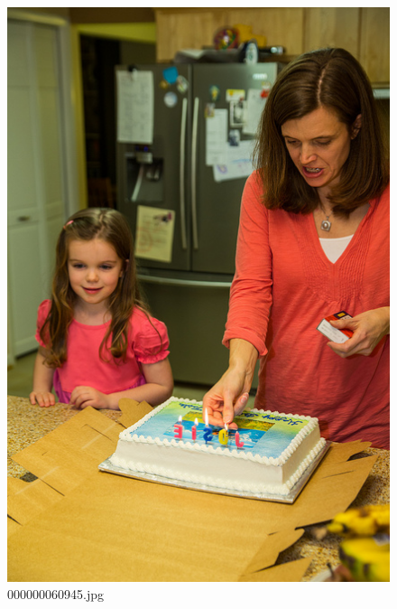     \begin{figure}[h]
        \centering
        \includegraphics[width=0.8\linewidth]{../image set/easy/000000060945.jpg}
        \caption{000000060945.jpg}
    \end{figure}

